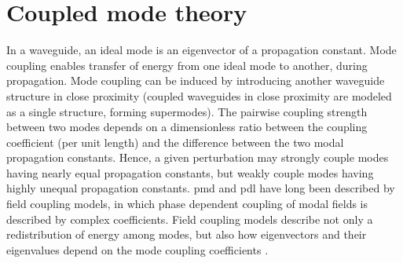 \documentclass[../report.tex]{subfiles}
\begin{document}
	\section{Coupled mode theory}\label{concept:mode_coupling}
In a waveguide, an ideal mode is an eigenvector of a propagation constant. Mode coupling enables transfer of energy from one ideal mode to another, during propagation. Mode coupling can be induced by introducing another waveguide structure in close proximity (coupled waveguides in close proximity are modeled as a single structure, forming supermodes). The pairwise coupling strength between two modes depends on a dimensionless ratio between the coupling coefficient (per unit length) and the difference between the two modal propagation constants. Hence, a given perturbation may strongly couple modes having nearly equal propagation constants, but weakly couple modes having highly unequal propagation constants. \gls{pmd} and \gls{pdl} have long been described by field coupling models, in which phase dependent coupling of modal fields is described by complex coefficients. Field coupling models describe not only a redistribution of energy among modes, but also how eigenvectors and their eigenvalues depend on the mode coupling coefficients \cite{kahn_mode_2012}.
\end{document}
